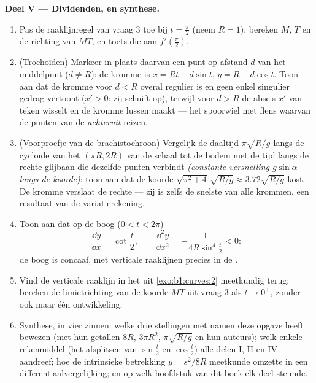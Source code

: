 \begin{problem}
\medskip
\noindent\textbf{Deel V --- Dividenden, en synthese.}
\begin{enumerate}[resume]
  \item Pas de raaklijnregel van vraag 3 toe bij $t = \frac\pi2$
        (neem $R = 1$): bereken $M$, $T$ en de richting van $MT$, en
        toets die aan $f'(\frac\pi2)$.
  \item (Trochoïden) Markeer in plaats daarvan een punt op afstand
        $d$ van het middelpunt ($d \neq R$): de kromme is $x = Rt -
        d\sin t$, $y = R - d\cos t$. Toon aan dat de kromme voor $d
        < R$ overal regulier is en geen enkel singulier gedrag
        vertoont ($x' > 0$: zij schuift op), terwijl voor $d > R$
        de abscis $x'$ van teken wisselt en de kromme lussen maakt
        --- het spoorwiel met flens waarvan de punten van de 
        \emph{achteruit} reizen.
  \item (Voorproefje van de brachistochroon) Vergelijk de daaltijd
        $\pi\sqrt{R/g}$ langs de cycloïde van het  $(\pi R,
        2R)$ van de schaal tot de bodem met de tijd langs de rechte
        glijbaan die dezelfde punten verbindt \emph{(constante
        versnelling $g\sin\alpha$ langs de koorde)}: toon aan dat
        de koorde $\sqrt{\pi^2 + 4}\,\sqrt{R/g} \approx
        3.72\sqrt{R/g}$ kost. De kromme verslaat de rechte --- zij
        is zelfs de snelste van alle krommen, een resultaat van de
        variatierekening.
  \item Toon aan dat op de boog ($0 < t < 2\pi$)
        \[
        \frac{\dd y}{\dd x} = \cot\frac t2,
        \qquad
        \frac{\dd^2 y}{\dd x^2} =
        -\frac{1}{4R\sin^4\frac t2} < 0 :
        \]
        de boog is concaaf, met verticale raaklijnen precies in de
        .
  \item Vind de verticale raaklijn in het  uit
        \cref{exo:b1:curves:2} meetkundig terug: bereken de
        limietrichting van de koorde $MT$ uit vraag 3 als $t \to
        0^{+}$, zonder ook maar één ontwikkeling.
  \item Synthese, in vier zinnen: welke drie stellingen met namen
        deze opgave heeft bewezen (met hun getallen $8R$, $3\pi
        R^2$, $\pi\sqrt{R/g}$ en hun auteurs); welk enkele
        rekenmiddel (het afsplitsen van $\sin\frac t2$ en
        $\cos\frac t2$) alle delen I, II en IV aandreef; hoe de
        intrinsieke betrekking $y = s^2/8R$ meetkunde omzette in
        een  differentiaalvergelijking; en op welk
        hoofdstuk van dit boek elk deel steunde.
\end{enumerate}
\end{problem}
